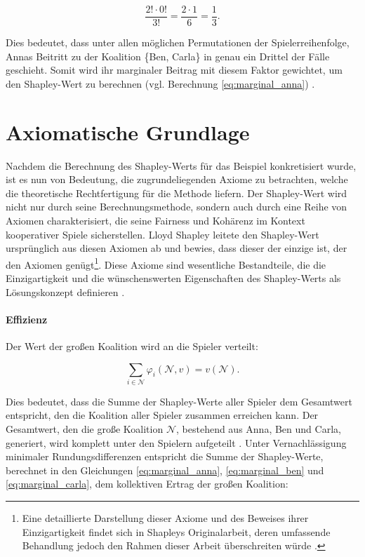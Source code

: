 \begin{equation}
\frac{2! \cdot 0!}{3!} = \frac{2 \cdot 1}{6} = \frac{1}{3}.
\end{equation}

Dies bedeutet, dass unter allen möglichen Permutationen der Spielerreihenfolge, Annas Beitritt zu der Koalition \{Ben, Carla\} 
in genau ein Drittel der Fälle geschieht. Somit wird ihr marginaler Beitrag mit diesem Faktor gewichtet, 
um den Shapley-Wert zu berechnen (vgl. Berechnung \ref{eq:marginal_anna}) \cite[S. 21f]{Molnar_2023}.


\section{Axiomatische Grundlage}
\label{sec:axiome-shapley}

Nachdem die Berechnung des Shapley-Werts für das Beispiel konkretisiert wurde, ist es nun von Bedeutung, die zugrundeliegenden Axiome zu betrachten, 
welche die theoretische Rechtfertigung für die Methode liefern. Der Shapley-Wert wird nicht nur durch seine Berechnungsmethode, 
sondern auch durch eine Reihe von Axiomen charakterisiert, die seine Fairness und Kohärenz im Kontext kooperativer Spiele sicherstellen. 
Lloyd Shapley leitete den Shapley-Wert ursprünglich aus diesen Axiomen ab und bewies, 
dass dieser der einzige ist, der den Axiomen genügt\footnote{Eine detaillierte Darstellung dieser Axiome und des Beweises 
ihrer Einzigartigkeit findet sich in Shapleys Originalarbeit, deren umfassende Behandlung jedoch den Rahmen dieser Arbeit überschreiten würde \cite[S. 307-318]{Shapley+1953+307+318}.}. 
Diese Axiome sind wesentliche Bestandteile, die die Einzigartigkeit und die wünschenswerten Eigenschaften des Shapley-Werts als Lösungskonzept definieren \cite[S. 22]{Molnar_2023}. 

\paragraph{Effizienz}

Der Wert der großen Koalition wird an die Spieler verteilt:

\begin{equation}
\sum_{i \in \mathcal{N}} \varphi_i (\mathcal{N}, v) = v(\mathcal{N}).
\end{equation}

Dies bedeutet, dass die Summe der Shapley-Werte aller Spieler dem Gesamtwert entspricht, 
den die Koalition aller Spieler zusammen erreichen kann. Der Gesamtwert, den die große Koalition $\mathcal{N}$, 
bestehend aus Anna, Ben und Carla, generiert, wird komplett unter den Spielern aufgeteilt \cite[S. 22]{Molnar_2023}. 
Unter Vernachlässigung minimaler Rundungsdifferenzen entspricht die Summe der Shapley-Werte, 
berechnet in den Gleichungen \ref{eq:marginal_anna}, \ref{eq:marginal_ben} und \ref{eq:marginal_carla}, 
dem kollektiven Ertrag der großen Koalition:

